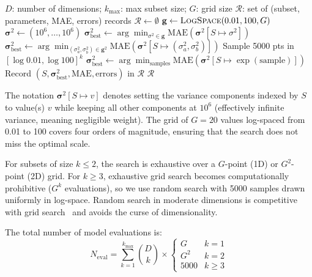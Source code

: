 \documentclass[manuscript,review,anonymous]{acmart}
\newcommand{\MAE}{\mathrm{MAE}}
\begin{document}
\begin{algorithm}[t]
\caption{DimensionEnumeration$(D, k_{\max}, G)$}
\label{alg:enumerate}
\begin{algorithmic}[1]
\REQUIRE $D$: number of dimensions; $k_{\max}$: max subset size; $G$: grid size
\ENSURE $\mathcal{R}$: set of (subset, parameters, MAE, errors) records
\STATE $\mathcal{R} \leftarrow \emptyset$
\STATE $\mathbf{g} \leftarrow \textsc{LogSpace}(0.01, 100, G)$ 
        \STATE $\boldsymbol{\sigma}^2 \leftarrow (10^6, \ldots, 10^6)$ 
            \STATE $\boldsymbol{\sigma}_{\mathrm{best}}^2 \leftarrow \arg\min_{\sigma^2 \in \mathbf{g}} \MAE(\boldsymbol{\sigma}^2[S \!\mapsto\! \sigma^2])$
            \STATE $\boldsymbol{\sigma}_{\mathrm{best}}^2 \leftarrow \arg\min_{(\sigma_a^2, \sigma_b^2) \in \mathbf{g}^2} \MAE(\boldsymbol{\sigma}^2[S \!\mapsto\! (\sigma_a^2, \sigma_b^2)])$
        \ELSE %
            \STATE Sample 5000 pts in $[\log 0.01, \log 100]^k$
            \STATE $\boldsymbol{\sigma}_{\mathrm{best}}^2 \leftarrow \arg\min_{\text{samples}} \MAE(\boldsymbol{\sigma}^2[S \!\mapsto\! \exp(\text{sample})])$
        \ENDIF
        \STATE Record $(S, \boldsymbol{\sigma}_{\mathrm{best}}^2, \MAE, \text{errors})$ in $\mathcal{R}$
    \ENDFOR
\ENDFOR
\RETURN $\mathcal{R}$
\end{algorithmic}
\end{algorithm}

The notation $\boldsymbol{\sigma}^2[S \mapsto v]$ denotes setting the variance components indexed by $S$ to value(s) $v$ while keeping all other components at $10^6$ (effectively infinite variance, meaning negligible weight).
The grid of $G = 20$ values log-spaced from 0.01 to 100 covers four orders of magnitude, ensuring that the search does not miss the optimal scale.

For subsets of size $k \leq 2$, the search is exhaustive over a $G$-point (1D) or $G^2$-point (2D) grid.
For $k \geq 3$, exhaustive grid search becomes computationally prohibitive ($G^k$ evaluations), so we use random search with 5000 samples drawn uniformly in log-space.
Random search in moderate dimensions is competitive with grid search~\cite{bergstra2012} and avoids the curse of dimensionality.

The total number of model evaluations is:
\begin{equation}
    N_{\mathrm{eval}} = \sum_{k=1}^{k_{\max}} \binom{D}{k} \times \begin{cases} G & k = 1 \\ G^2 & k = 2 \\ 5000 & k \geq 3 \end{cases}
    \label{eq:neval}
\end{equation}
\end{document}
